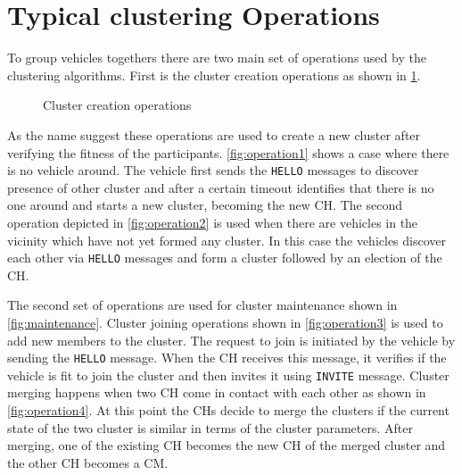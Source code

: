 \documentclass[]{ccs-thesis}
\begin{document}
\section{Typical clustering Operations}

To group vehicles togethers there are two main set of operations used by the clustering algorithms. First is the cluster creation operations
as shown in \cref{fig:creation}.

\begin{figure}[h]
    \centering
    \vfill%

    \caption{Cluster creation operations}
    \label{fig:creation}
\end{figure}

As the name suggest these operations are used to create a new cluster after verifying the fitness of the
participants. \cref{fig:operation1} shows a case where there is no vehicle around. The vehicle first sends the \texttt{HELLO} messages to
discover presence of other cluster and after a certain timeout identifies that there is no one around and starts a new cluster, becoming the
new \ac{CH}. The second operation depicted in \cref{fig:operation2} is used when there are vehicles in the vicinity which have not yet formed
any cluster. In this case the vehicles discover each other via \texttt{HELLO} messages and form a cluster followed by an election of the
\ac{CH}.

The second set of operations are used for cluster maintenance shown in \cref{fig:maintenance}. Cluster joining operations shown in \cref{fig:operation3}
is used to add new members to the cluster. The request to join is initiated by the vehicle by sending the \texttt{HELLO} message. When the \ac{CH} receives
this message, it verifies if the vehicle is fit to join the cluster and then invites it using \texttt{INVITE} message. Cluster merging happens when two
\ac{CH} come in contact with each other as shown in \cref{fig:operation4}. At this point the \ac{CH}s decide to merge the clusters if the current state of
the two cluster is similar in terms of the cluster parameters. After merging, one of the existing \ac{CH} becomes the new \ac{CH} of the merged cluster and
the other \ac{CH} becomes a \ac{CM}.
\end{document}
